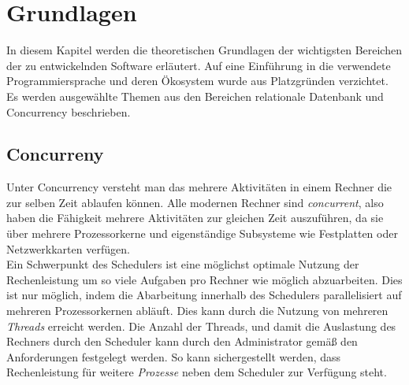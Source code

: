 \chapter{Grundlagen}\label{chap:Grundlagen}
\chapterstart
In diesem Kapitel werden die theoretischen Grundlagen der wichtigsten Bereichen der zu entwickelnden Software erläutert. Auf eine Einführung in die verwendete Programmiersprache und deren Ökosystem wurde aus Platzgründen verzichtet. Es werden ausgewählte Themen aus den Bereichen relationale Datenbank und Concurrency beschrieben.

\section{Concurreny}
Unter Concurrency versteht man das mehrere Aktivitäten in einem Rechner die zur selben Zeit ablaufen können. Alle modernen Rechner sind \emph{concurrent}, also haben die Fähigkeit mehrere Aktivitäten zur gleichen Zeit auszuführen, da sie über mehrere Prozessorkerne und eigenständige Subsysteme wie Festplatten oder Netzwerkkarten verfügen.\parencite{Anderson2014}
\\Ein Schwerpunkt des Schedulers ist eine möglichst optimale Nutzung der Rechenleistung um so viele Aufgaben pro Rechner wie möglich abzuarbeiten. Dies ist nur möglich, indem die Abarbeitung innerhalb des Schedulers parallelisiert auf mehreren Prozessorkernen abläuft. Dies kann durch die Nutzung von mehreren \emph{Threads} erreicht werden. Die Anzahl der Threads, und damit die Auslastung des Rechners durch den Scheduler kann durch den Administrator gemäß den Anforderungen festgelegt werden. So kann sichergestellt werden, dass Rechenleistung für weitere \emph{Prozesse} neben dem Scheduler zur Verfügung steht.

